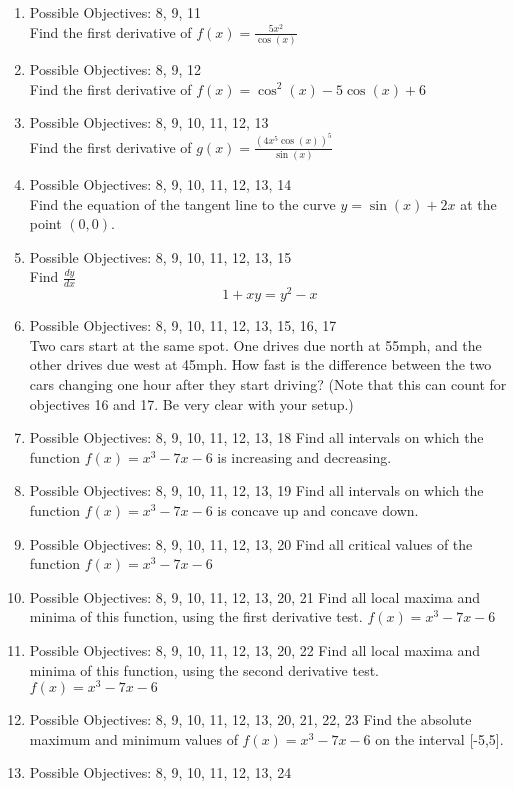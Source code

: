 \documentclass{exam}
\begin{document}
\begin{enumerate}
\item Possible Objectives: 8, 9, 11\\
Find the first derivative of $f(x) = \frac{5x^2}{\cos(x)}$

\item Possible Objectives: 8, 9, 12\\ 
Find the first derivative of $f(x) = \cos^2(x) - 5\cos(x) + 6$
\item Possible Objectives: 8, 9, 10, 11, 12, 13\\
Find the first derivative of $g(x) = \frac{(4x^5\cos(x))^5}{\sin(x)}$

\item Possible Objectives: 8, 9, 10, 11, 12, 13, 14\\
Find the equation of the tangent line to the curve $y = \sin(x) + 2x$ at the point $(0,0)$.
\item Possible Objectives: 8, 9, 10, 11, 12, 13, 15\\
Find $\frac{dy}{dx}$
$$1 + xy = y^2 - x$$
\item Possible Objectives: 8, 9, 10, 11, 12, 13, 15, 16, 17\\
Two cars start at the same spot. One drives due north at 55mph, and the other drives due west at 45mph. How fast is the difference between the two cars changing one hour after they start driving? (Note that this can count for objectives 16 and 17. Be very clear with your setup.)
\item Possible Objectives: 8, 9, 10, 11, 12, 13, 18
Find all intervals on which the function $f(x) = x^3 - 7x -6$
 is increasing and decreasing.
\item Possible Objectives: 8, 9, 10, 11, 12, 13, 19
Find all intervals on which the function $f(x) = x^3 - 7x -6$
 is concave up and concave down.
\item Possible Objectives: 8, 9, 10, 11, 12, 13, 20
Find all critical values of the function $f(x) = x^3 - 7x -6$
\item Possible Objectives: 8, 9, 10, 11, 12, 13, 20, 21
Find all local maxima and minima of this function, using the first derivative test.
$f(x) = x^3 - 7x -6$
\item Possible Objectives: 8, 9, 10, 11, 12, 13, 20, 22
Find all local maxima and minima of this function, using the second derivative test.
$f(x) = x^3 - 7x -6$
\item Possible Objectives: 8, 9, 10, 11, 12, 13, 20, 21, 22, 23
Find the absolute maximum and minimum values of $f(x) = x^3 - 7x -6$ on the interval [-5,5].
\item Possible Objectives: 8, 9, 10, 11, 12, 13, 24

\end{enumerate}
\end{document}
